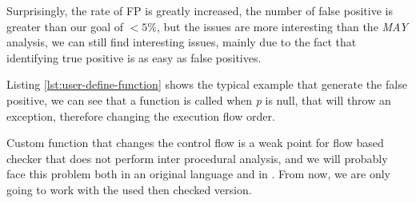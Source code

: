 Surprisingly, the rate of FP is greatly increased, the number of false positive is greater than our goal of $<5\%$, but the issues are more interesting than the \emph{MAY} analysis, we can still find interesting issues, mainly due to the fact that identifying true positive is as easy as false positives.

 

Listing \ref{lst:user-define-function} shows the typical example that generate the false positive, we can see that a function is called when \emph{p} is null, that will throw an exception, therefore changing the execution flow order.

Custom function that changes the control flow is a weak point for flow based checker that does not perform inter procedural analysis, and we will probably face this problem both in an original language and in \slang. From now, we are only going to work with the used then checked version.




